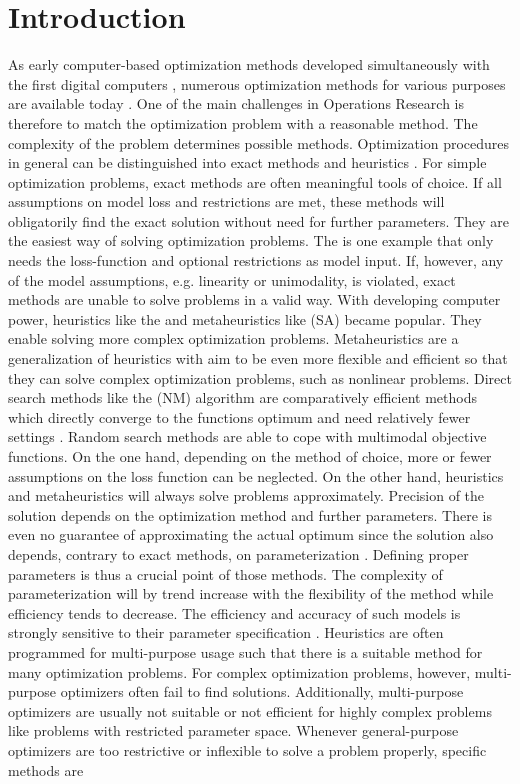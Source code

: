 \section{Introduction}
As early computer-based optimization methods developed simultaneously with the first digital computers \citep{corana_1987}, numerous optimization methods for various purposes are available today \citep{wegener_2005}. One of the main challenges in Operations Research is therefore to match the optimization problem with a reasonable method. The complexity of the problem determines possible methods. Optimization procedures in general can be distinguished into exact methods and heuristics \citep{kirkpatrick_1983}. For simple optimization problems, exact methods are often meaningful tools of choice. If all assumptions on model loss and restrictions are met, these methods will obligatorily find the exact solution without need for further parameters. They are the easiest way of solving optimization problems. The  \citep{dantzig_1959} is one example that only needs the loss-function and optional restrictions as model input. If, however, any of the model assumptions, e.g. linearity or unimodality, is violated, exact methods are unable to solve problems in a valid way. With developing computer power, heuristics like the  \citep{clarke_1964} and metaheuristics like  (SA) \citep{kirkpatrick_1983} became popular. They enable solving more complex optimization problems. Metaheuristics are a generalization of heuristics with aim to be even more flexible and efficient \citep{blum_2003} so that they can solve complex optimization problems, such as nonlinear problems. Direct search methods like the  (NM) algorithm are comparatively efficient methods which directly converge to the functions optimum and need relatively fewer settings \citep{geiger_1999}. Random search methods are able to cope with multimodal objective functions. On the one hand, depending on the method of choice, more or fewer assumptions on the loss function can be neglected. On the other hand, heuristics and metaheuristics will always solve problems approximately. Precision of the solution depends on the optimization method and further parameters. There is even no guarantee of approximating the actual optimum since the solution also depends, contrary to exact methods, on parameterization \citep{blum_2003}. Defining proper parameters is thus a crucial point of those methods. The complexity of parameterization will by trend increase with the flexibility of the method while efficiency tends to decrease. The efficiency and accuracy of such models is strongly sensitive to their parameter specification \citep{corana_1987}. Heuristics are often programmed for multi-purpose usage such that there is a suitable method for many optimization problems. For complex optimization problems, however, multi-purpose optimizers often fail to find solutions. Additionally, multi-purpose optimizers are usually not suitable or not efficient for highly complex problems like problems with restricted parameter space. Whenever general-purpose optimizers are too restrictive or inflexible to solve a problem properly, specific methods are 